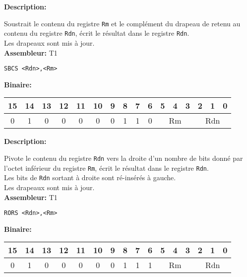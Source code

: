 
\textbf{Description: }

Soustrait le contenu du registre \texttt{Rm} et le complément du drapeau de retenu au contenu du registre \texttt{Rdn}, écrit le résultat dans le registre \texttt{Rdn}.\\
Les drapeaux sont mis à jour.\\

\textbf{Assembleur:} T1

\begin{lstlisting}
SBCS <Rdn>,<Rm>
\end{lstlisting}

\textbf{Binaire:}\\

\begin{tabular}{| c c c c c c c c c c c c c c c c |}
\hline
15 & 14 & 13 & 12 & 11 & 10 & \multicolumn{1}{|c}{9} & 8 & 7 & 6 & \multicolumn{1}{|c}{5} & 4 & 3 & \multicolumn{1}{|c}{2} & 1 & 0 \\
\hline
0 & 1 & 0 & 0 & 0 & 0 & \multicolumn{1}{|c}{0} & 1 & 1 & 0 & \multicolumn{3}{|c}{Rm} & \multicolumn{3}{|c|}{Rdn} \\
\hline
\end{tabular}




\textbf{Description: }

Pivote le contenu du registre \texttt{Rdn} vers la droite d'un nombre de bits donné par l'octet inférieur du registre \texttt{Rm}, écrit le résultat dans le registre \texttt{Rdn}.\\
Les bits de \texttt{Rdn} sortant à droite sont ré-insérés à gauche.\\
Les drapeaux sont mis à jour.\\

\textbf{Assembleur:} T1

\begin{lstlisting}
RORS <Rdn>,<Rm>
\end{lstlisting}

\textbf{Binaire:}\\

\begin{tabular}{| c c c c c c c c c c c c c c c c |}
\hline
15 & 14 & 13 & 12 & 11 & 10 & \multicolumn{1}{|c}{9} & 8 & 7 & 6 & \multicolumn{1}{|c}{5} & 4 & 3 & \multicolumn{1}{|c}{2} & 1 & 0 \\
\hline
0 & 1 & 0 & 0 & 0 & 0 & \multicolumn{1}{|c}{0} & 1 & 1 & 1 & \multicolumn{3}{|c}{Rm} & \multicolumn{3}{|c|}{Rdn} \\
\hline
\end{tabular}


